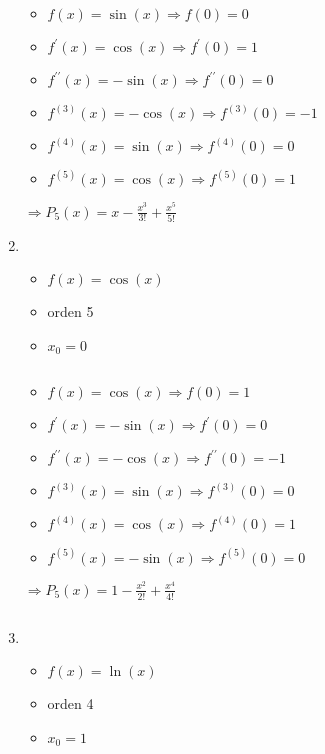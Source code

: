 \documentclass[../practica_05.tex]{subfiles}
\begin{document}
\begin{enumerate}
            $ $

            \begin{itemize}
                \item $f(x) = \sin(x) \Rightarrow f(0) = 0$
                \item $f^\prime(x) = \cos(x) \Rightarrow f^\prime(0) = 1$
                \item $f^{\prime\prime}(x) = -\sin(x) \Rightarrow f^{\prime\prime}(0) = 0$
                \item $f^{(3)}(x) = -\cos(x) \Rightarrow f^{(3)}(0) = -1$
                \item $f^{(4)}(x) = \sin(x) \Rightarrow f^{(4)}(0) = 0$
                \item $f^{(5)}(x) = \cos(x) \Rightarrow f^{(5)}(0) = 1$
            \end{itemize}

            $\Rightarrow P_5(x) = x - \frac{x^3}{3!} + \frac{x^5}{5!}$

        \item
            \begin{itemize}
                \item $f(x) = \cos(x)$
                \item orden 5
                \item $x_0 = 0$
            \end{itemize}

            $ $

            \begin{itemize}
                \item $f(x) = \cos(x) \Rightarrow f(0) = 1$
                \item $f^\prime(x) = -\sin(x) \Rightarrow f^\prime(0) = 0$
                \item $f^{\prime\prime}(x) = -\cos(x) \Rightarrow f^{\prime\prime}(0) = -1$
                \item $f^{(3)}(x) = \sin(x) \Rightarrow f^{(3)}(0) = 0$
                \item $f^{(4)}(x) = \cos(x) \Rightarrow f^{(4)}(0) = 1$
                \item $f^{(5)}(x) = -\sin(x) \Rightarrow f^{(5)}(0) = 0$
            \end{itemize}

            $\Rightarrow P_5(x) = 1 - \frac{x^2}{2!} + \frac{x^4}{4!} $

            $ $

        \item
            \begin{itemize}
                \item $f(x) = \ln(x)$
                \item orden 4
                \item $x_0 = 1$
            \end{itemize}


\end{enumerate}
\end{document}
